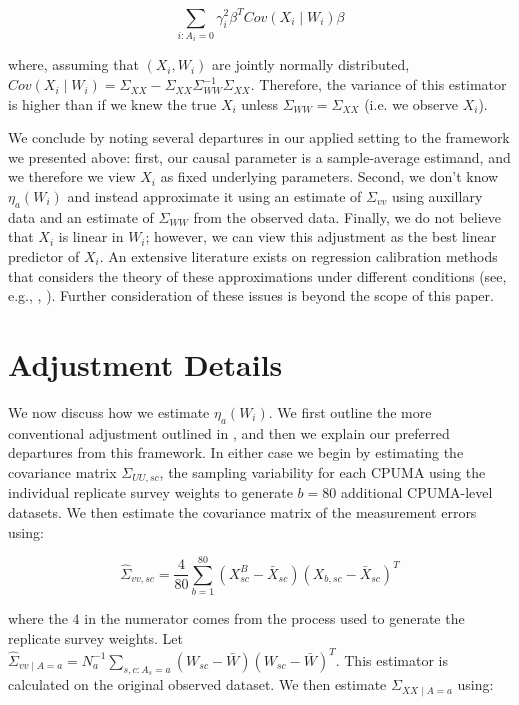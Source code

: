 \documentclass{article}
\begin{document}
\begin{appendix}
\begin{remark}
$$
\sum_{i: A_i = 0} \gamma_i^2\beta^TCov(X_i \mid W_i)\beta
$$

where, assuming that $(X_i, W_i)$ are jointly normally distributed, $Cov(X_i \mid W_i) = \Sigma_{XX} - \Sigma_{XX}\Sigma_{WW}^{-1}\Sigma_{XX}$. Therefore, the variance of this estimator is higher than if we knew the true $X_i$ unless $\Sigma_{WW} = \Sigma_{XX}$ (i.e. we observe $X_i$). 
\end{remark}

We conclude by noting several departures in our applied setting to the framework we presented above: first, our causal parameter is a sample-average estimand, and we therefore we view $X_i$ as fixed underlying parameters. Second, we don't know $\eta_a(W_i)$ and instead approximate it using an estimate of $\Sigma_{vv}$ using auxillary data and an estimate of $\Sigma_{WW}$ from the observed data. Finally, we do not believe that $X_i$ is linear in $W_i$; however, we can view this adjustment as the best linear predictor of $X_i$. An extensive literature exists on regression calibration methods that considers the theory of these approximations under different conditions (see, e.g., \cite{gleser1992importance}, \cite{carroll2006measurement}). Further consideration of these issues is beyond the scope of this paper.

\section{Adjustment Details}

We now discuss how we estimate $\eta_a(W_i)$. We first outline the more conventional adjustment outlined in \cite{carroll2006measurement}, and then we explain our preferred departures from this framework. In either case we begin by estimating the covariance matrix $\Sigma_{UU, sc}$, the sampling variability for each CPUMA using the individual replicate survey weights to generate $b = 80$ additional CPUMA-level datasets. We then estimate the covariance matrix of the measurement errors using:

$$
\hat{\Sigma}_{vv, sc} = \frac{4}{80}\sum_{b=1}^{80}(X_{sc}^B - \bar{X}_{sc})(X_{b, sc} - \bar{X}_{sc})^T
$$

where the $4$ in the numerator comes from the process used to generate the replicate survey weights. Let $\hat{\Sigma}_{vv \mid A = a} = N_a^{-1}\sum_{s, c: A_s = a} (W_{sc} - \bar{W})(W_{sc} - \bar{W})^T$. This estimator is calculated on the original observed dataset. We then estimate $\Sigma_{XX \mid A = a}$ using:


\end{appendix}
\end{document}
